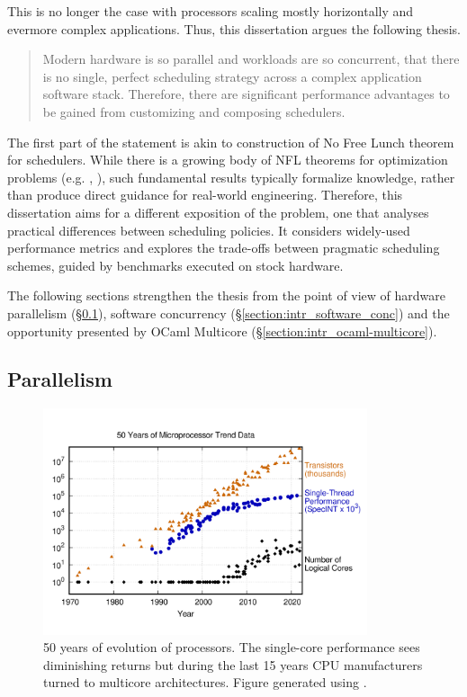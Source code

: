 \documentclass[12pt,a4paper,twoside]{report}
\begin{document}
This is no longer the case with processors scaling mostly horizontally and evermore complex applications. Thus, this dissertation argues the following thesis. 

\begin{quote}
    Modern hardware is so parallel and workloads are so concurrent, that there is no single, perfect scheduling strategy across a complex application software stack. Therefore, there are significant performance advantages to be gained from customizing and composing schedulers.
\end{quote} 

The first part of the statement is akin to construction of No Free Lunch theorem \cite{Ho2002} for schedulers. While there is a growing body of NFL theorems for optimization problems (e.g. \cite{Wolpert1997}, \cite{Igel2005}), such fundamental results typically formalize knowledge, rather than produce direct guidance for real-world engineering. Therefore, this dissertation aims for a different exposition of the problem, one that analyses practical differences between scheduling policies. It considers widely-used performance metrics and explores the trade-offs between pragmatic scheduling schemes, guided by benchmarks executed on stock hardware. 

The following sections strengthen the thesis from the point of view of hardware parallelism (\S\ref{section:intr_hardware_par}), software concurrency (\S\ref{section:intr_software_conc}) and the opportunity presented by OCaml Multicore (\S\ref{section:intr_ocaml-multicore}).

\subsection{Parallelism}
\label{section:intr_hardware_par}


\begin{figure}
    \centering
    \includegraphics[width=0.85\textwidth]{50-years-processor-trend.png}
    \caption{50 years of evolution of processors. The single-core performance sees diminishing returns but during the last 15 years CPU manufacturers turned to multicore architectures. Figure generated using \cite{karlrupp48:online}.}
   \label{fig:50yrs}
\end{figure}
\end{document}
